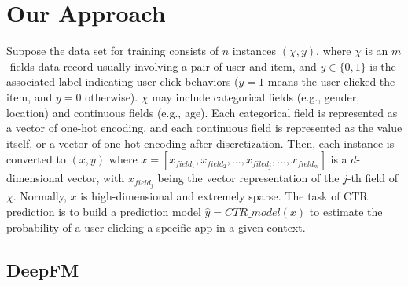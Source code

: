 \section{Our Approach}\label{section:App}


Suppose the data set for training consists of $n$ instances $(\chi,y)$, where $\chi$ is an $m$-fields data record usually involving a pair of user and item, and $y\in\{0,1\}$ is the associated label indicating user click behaviors ($y=1$ means the user clicked the item, and $y=0$ otherwise). $\chi$ may include categorical fields (e.g., gender, location) and continuous fields (e.g., age). Each categorical field is represented as a vector of one-hot encoding, and each continuous field is represented as the value itself, or a vector of one-hot encoding after discretization. Then, each instance is converted to $(x,y)$ where $x=[x_{field_1},x_{field_2}, ...,x_{filed_j},...,x_{field_m}]$ is a $d$-dimensional vector, with $x_{field_j}$ being the vector representation of the $j$-th field of $\chi$. Normally, $x$ is high-dimensional and extremely sparse. The task of CTR prediction is to build a prediction model $\hat{y}=CTR\_model(x)$ to estimate the probability of a user clicking a specific app in a given context.

\subsection{DeepFM}\label{section:App:model}


